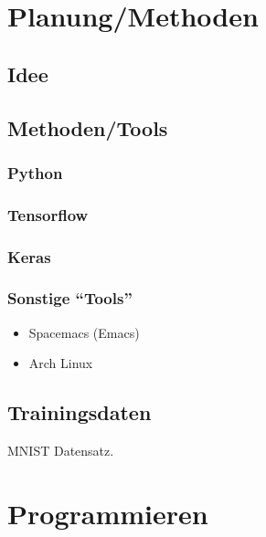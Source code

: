 \section{Planung/Methoden}

\subsection{Idee}


\subsection{Methoden/Tools}

\subsubsection{Python}
\subsubsection{Tensorflow}
\subsubsection{Keras}
\subsubsection{Sonstige ``Tools''}
\begin{itemize}
\item{Spacemacs (Emacs)}
\item{Arch Linux}
\end{itemize}

\subsection{Trainingsdaten}
MNIST Datensatz.



\section{Programmieren}



